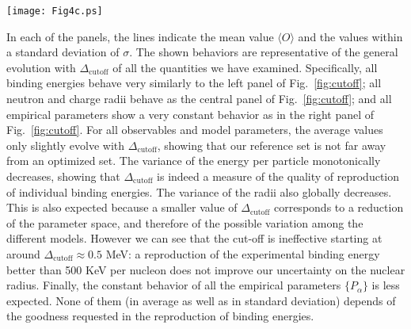 \documentclass
[aps,prc,twocolumn,showpacs,showkeys,amsmath,floatfix,superscriptaddress]{revtex4}
\begin{document}
{{\begin{figure*}[htbp]
\vskip -2cm  
\hspace*{-2 cm}
\hspace*{-1.6 cm}
      \texttt{[image: Fig4c.ps]} 
      
\caption{(Color online) Effect of cut-off in $\Delta$ on the average (central purple line) and standard deviation (band width) for two different observables: the $^{208}$Pb binding energy per nucleon (left) and its neutron radius (center); and the $n_{sat}$ empirical parameter (right).  In each panel, the inset shows the same, for $\Delta_\mathrm{cutoff} < 0.5$.}
      \label{fig:cutoff}
 \end{figure*}
 
 
 In each of the panels, the lines indicate the mean value $\langle O \rangle$ and the values within a standard deviation of $\sigma$.
The shown behaviors are representative of the general evolution with $\Delta_\mathrm{cutoff}$ of all the quantities we have examined. Specifically, all binding energies behave very similarly to the left panel of Fig.~\ref{fig:cutoff}; all neutron and charge radii behave as the central panel of Fig.~\ref{fig:cutoff}; and all empirical parameters show a very constant behavior as in the right panel of Fig.~\ref{fig:cutoff}.
For all observables and model parameters, the average values only slightly evolve with $\Delta_\mathrm{cutoff}$, showing that our reference set is not
far away from an optimized set.
The variance of the energy per particle monotonically decreases, showing that $\Delta_\mathrm{cutoff}$ is indeed a measure of the quality of reproduction of individual binding energies. The variance of the radii also globally decreases. This is also expected because a smaller value of $\Delta_\mathrm{cutoff}$ corresponds to a reduction of the parameter space, and therefore of the possible variation among the different models. However we can see that the cut-off is ineffective starting at around $\Delta_\mathrm{cutoff}\approx 0.5$ MeV: a reproduction of the experimental binding energy better than 500 KeV per nucleon does not improve our uncertainty on the nuclear radius.
Finally,  the constant behavior of all the empirical parameters $\{ P_\alpha\}$ is less expected. None of them (in average as well as in standard deviation)  
depends of the goodness requested in the reproduction of binding energies. 
 
}}
\end{document}
